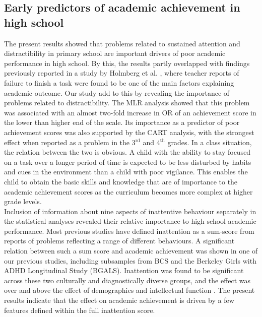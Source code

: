 \documentclass[10pt,letterpaper]{article}
\begin{document}
{\subsection*{Early predictors of academic achievement in high school}
The present results showed that problems related to sustained attention and distractibility in primary school are important drivers of poor academic performance in high school. By this, the results partly overlapped with findings previously reported in a study by Holmberg et al. \cite{Holmberg2014}, where  teacher reports of failure to finish a task were found to be one of the main factors explaining academic outcome. 
Our study add to this by revealing the importance of problems related to distractibility. The MLR analysis showed that this problem was associated with an almost two-fold increase in OR of an achievement score in the lower than higher end of the scale. Its importance as a predictor of poor achievement scores was also supported by the CART analysis, with the strongest effect when reported as a problem in the  3$^{\text{rd}}$ and 4$^{\text{th}}$ grades.  In a class situation, the relation between the two is obvious. A child with the ability to stay focused on a task over a longer period of time is expected to be less disturbed by habits and cues in the environment than a child with poor vigilance.  This enables the child to obtain the basic skills and knowledge that are of importance to the academic achievement scores as the curriculum becomes more complex at higher grade levels. \\

Inclusion of information about nine aspects of inattentive behaviour separately in the statistical analyses revealed their relative importance to high school academic performance. Most previous studies have defined inattention as a sum-score from reports of problems reflecting a range of different behaviours. A significant relation between such a sum score and academic achievement was shown in one of our previous studies, including subsamples from BCS and the Berkeley Girls with ADHD Longitudinal Study (BGALS). Inattention was found to be significant across these two culturally and diagnostically diverse groups, and the effect was over and above the effect of demographics and intellectual function \cite{Lundervold2017}. The present results indicate that the effect on academic achievement is driven by a few features defined within the full inattention score.  \\

}
\end{document}
